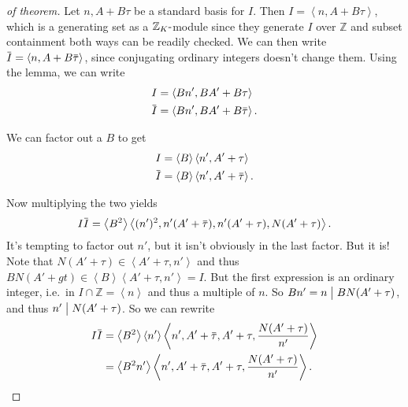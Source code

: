 \begin{proof}[of theorem]

Let \(n, A + B \tau\) be a standard basis for \(I\). Then
\(I = \left\langle{ n, A+ B \tau }\right\rangle\), which is a generating
set as a \({\mathbb{Z}}_K{\hbox{-}}\)module since they generate \(I\)
over \({\mathbb{Z}}\) and subset containment both ways can be readily
checked. We can then write
\(\mkern 1.5mu\overline{\mkern-1.5muI\mkern-1.5mu}\mkern 1.5mu = \left\langle{ n, A+B \mkern 1.5mu\overline{\mkern-1.5mu\tau \mkern-1.5mu}\mkern 1.5mu}\right\rangle\),
since conjugating ordinary integers doesn't change them. Using the
lemma, we can write
\begin{align*}
I &= \left\langle{ Bn', BA' + B \tau }\right\rangle\\
\mkern 1.5mu\overline{\mkern-1.5muI\mkern-1.5mu}\mkern 1.5mu &= \left\langle{ Bn', BA' + B \mkern 1.5mu\overline{\mkern-1.5mu\tau\mkern-1.5mu}\mkern 1.5mu }\right\rangle
.\end{align*}

We can factor out a \(B\) to get
\begin{align*}
I &= \left\langle{ B }\right\rangle \left\langle{ n', A' + \tau}\right\rangle \\  
\mkern 1.5mu\overline{\mkern-1.5muI\mkern-1.5mu}\mkern 1.5mu &= \left\langle{ B }\right\rangle \left\langle{ n', A' + \mkern 1.5mu\overline{\mkern-1.5mu\tau\mkern-1.5mu}\mkern 1.5mu }\right\rangle 
.\end{align*}

Now multiplying the two yields
\begin{align*}
I \mkern 1.5mu\overline{\mkern-1.5muI\mkern-1.5mu}\mkern 1.5mu = \left\langle{ B^2 }\right\rangle \left\langle{ (n')^2, n'(A' + \mkern 1.5mu\overline{\mkern-1.5mu \tau\mkern-1.5mu}\mkern 1.5mu ), n'(A' + \tau), N(A' + \tau) }\right\rangle  
.\end{align*}
It's tempting to factor out \(n'\), but it isn't obviously in the last
factor. But it is! Note that
\(N(A' + \tau) \in \left\langle{ A' + \tau, n' }\right\rangle\) and thus
\(B N(A' + gt) \in \left\langle{ B }\right\rangle \left\langle{ A' + \tau, n' }\right\rangle = I\).
But the first expression is an ordinary integer, i.e.~in
\(I \cap{\mathbb{Z}}= \left\langle{ n }\right\rangle\) and thus a
multiple of \(n\). So \(Bn' = n \bigm|BN(A' + \tau)\), and thus
\(n' \bigm|N(A' + \tau)\). So we can rewrite
\begin{align*}
I \mkern 1.5mu\overline{\mkern-1.5muI\mkern-1.5mu}\mkern 1.5mu 
&= \left\langle{ B^2 }\right\rangle \left\langle{ n' }\right\rangle \left\langle{ n', A' + \mkern 1.5mu\overline{\mkern-1.5mu \tau\mkern-1.5mu}\mkern 1.5mu , A' + \tau, { N(A' + \tau) \over n'} }\right\rangle   \\
&= \left\langle{ B^2 n' }\right\rangle 
\left\langle{ n', A' + \mkern 1.5mu\overline{\mkern-1.5mu \tau\mkern-1.5mu}\mkern 1.5mu , A' + \tau, { N(A' + \tau) \over  n'} }\right\rangle   
.\end{align*}


\end{proof}
